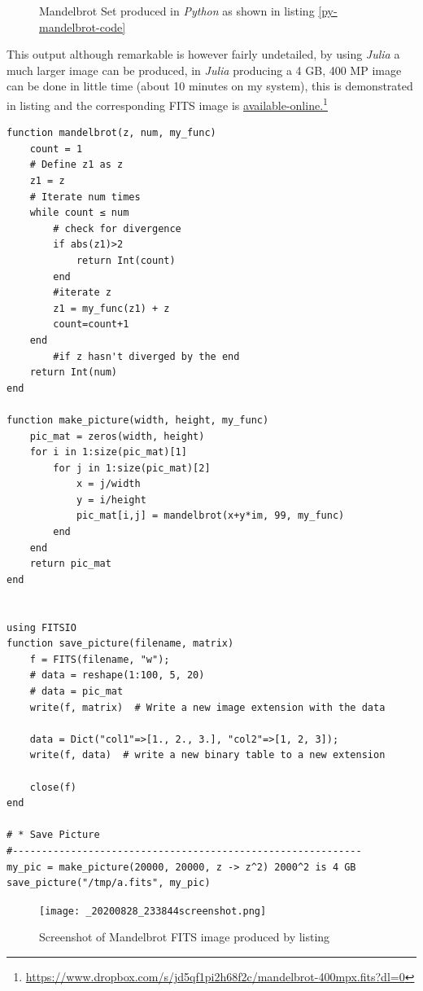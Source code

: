 \documentclass[11pt]{article}
\begin{document}
\begin{figure}[htbp]
\centering

\caption{\label{mandelbrot-py-pic}Mandelbrot Set produced in \emph{Python} as shown in listing \ref{py-mandelbrot-code}}
\end{figure}

This output although remarkable is however fairly undetailed, by using \emph{Julia} a much
larger image can be produced, in \emph{Julia} producing a 4 GB, 400 MP image can be done in little time
(about 10 minutes on my system), this is demonstrated in listing 
and the corresponding FITS image is \href{https://www.dropbox.com/s/jd5qf1pi2h68f2c/mandelbrot-400mpx.fits?dl=0}{available-online.}\footnote{\href{https://www.dropbox.com/s/jd5qf1pi2h68f2c/mandelbrot-400mpx.fits?dl=0}{https://www.dropbox.com/s/jd5qf1pi2h68f2c/mandelbrot-400mpx.fits?dl=0}}

\begin{verbatim}
function mandelbrot(z, num, my_func)
    count = 1
    # Define z1 as z
    z1 = z
    # Iterate num times
    while count ≤ num
        # check for divergence
        if abs(z1)>2
            return Int(count)
        end
        #iterate z
        z1 = my_func(z1) + z
        count=count+1
    end
        #if z hasn't diverged by the end
    return Int(num)
end

function make_picture(width, height, my_func)
    pic_mat = zeros(width, height)
    for i in 1:size(pic_mat)[1]
        for j in 1:size(pic_mat)[2]
            x = j/width
            y = i/height
            pic_mat[i,j] = mandelbrot(x+y*im, 99, my_func)
        end
    end
    return pic_mat
end


using FITSIO
function save_picture(filename, matrix)
    f = FITS(filename, "w");
    # data = reshape(1:100, 5, 20)
    # data = pic_mat
    write(f, matrix)  # Write a new image extension with the data

    data = Dict("col1"=>[1., 2., 3.], "col2"=>[1, 2, 3]);
    write(f, data)  # write a new binary table to a new extension

    close(f)
end

# * Save Picture
#------------------------------------------------------------
my_pic = make_picture(20000, 20000, z -> z^2) 2000^2 is 4 GB
save_picture("/tmp/a.fits", my_pic)

\end{verbatim}

\begin{figure}[htbp]
\centering
\texttt{[image: \_20200828\_233844screenshot.png]}
\caption{\label{mandelbrot-screen}Screenshot of Mandelbrot FITS image produced by listing }
\end{figure}
\end{document}
